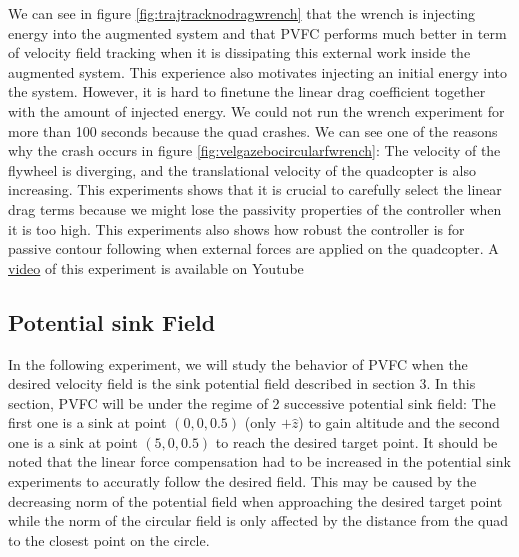 We can see in figure \ref{fig:trajtracknodragwrench} that the wrench is injecting energy into the augmented system and that PVFC performs much better in term of velocity field tracking when it is dissipating this external work inside the augmented system. 
This experience also motivates injecting an initial energy into the system. However, it is hard to finetune the linear drag coefficient together with the amount of injected energy.
We could not run the wrench experiment for more than 100 seconds because the quad crashes. We can see one of the reasons why the crash occurs in figure \ref{fig:velgazebocircularfwrench}: The velocity of the flywheel is diverging, and the translational velocity of the quadcopter is also increasing. 
This experiments shows that it is crucial to carefully select the linear drag terms because we might lose the passivity properties of the controller when it is too high.
This experiments also shows how robust the controller is for passive contour following when external forces are applied on the quadcopter.
A \href{https://youtu.be/NcAQGyCOlOk}{video} of this experiment is available on Youtube
\subsection{Potential sink Field}
In the following experiment, we will study the behavior of PVFC when the desired velocity field is the sink potential field described in section 3.
In this section, PVFC will be under the regime of 2 successive potential sink field: The first one is a sink at point $(0,0,0.5)$ (only $+\hat{z}$) to gain altitude and
the second one is a sink at point $(5,0,0.5)$ to reach the desired target point. 
It should be noted that the linear force compensation had to be increased in the potential sink experiments to accuratly follow the desired field.
This may be caused by the decreasing norm of the potential field when approaching the desired target point while the norm of the circular field is only affected by the distance from the quad to the closest point on the circle.  
